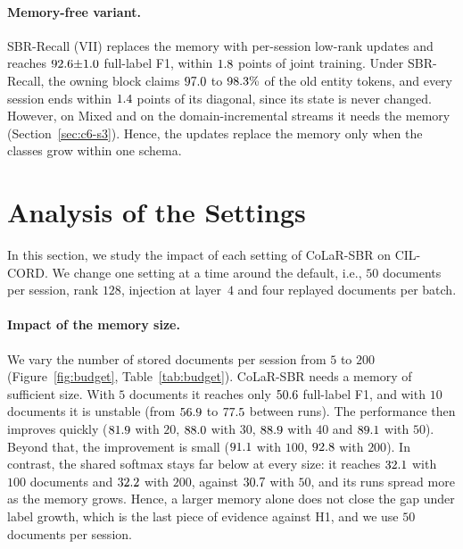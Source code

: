 \paragraph{Memory-free variant.} SBR-Recall (VII) replaces the memory with per-session
low-rank updates and reaches $92.6{\pm}1.0$ full-label F1, within $1.8$
points of joint training. Under SBR-Recall, the owning block claims $97.0$ to
$98.3\%$ of the old entity tokens, and every session ends within
$1.4$ points of its diagonal, since its state is never changed. However, on
Mixed and on the domain-incremental streams it needs the memory
(Section~\ref{sec:c6-s3}). Hence, the updates replace the memory only when the classes grow
within one schema.

\section{Analysis of the Settings}
\label{sec:c6-s5}

In this section, we study the impact of each setting of CoLaR-SBR on CIL-CORD. We change
one setting at a time around the default, i.e., $50$ documents per session, rank $128$,
injection at layer~$4$ and four replayed documents per batch.

\paragraph{Impact of the memory size.} We vary the number of stored documents per session
from $5$ to $200$ (Figure~\ref{fig:budget}, Table~\ref{tab:budget}). CoLaR-SBR needs a
memory of sufficient size. With $5$ documents it reaches only $50.6$ full-label
F1, and with $10$ documents it is unstable (from $56.9$ to $77.5$
between runs). The performance then improves quickly ($81.9$ with $20$,
$88.0$ with $30$, $88.9$ with $40$ and $89.1$ with $50$).
Beyond that, the improvement is small ($91.1$ with $100$, $92.8$
with $200$). In contrast, the shared softmax stays far below at every size: it reaches
$32.1$ with $100$ documents and $32.2$ with $200$, against
$30.7$ with $50$, and its runs spread more as the memory grows. Hence, a larger
memory alone does not close the gap under label growth, which is the last piece of evidence
against H1, and we use $50$ documents per session.

